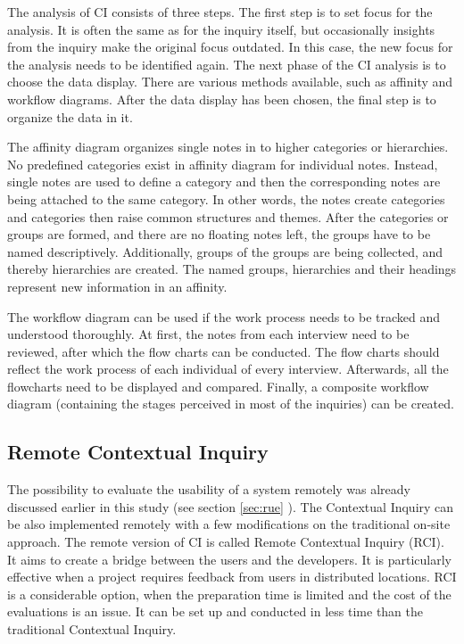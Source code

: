 \documentclass[12pt,a4paper,oneside,pdftex]{report}
\begin{document}
The analysis of CI consists of three steps. The first step is to set focus for the analysis. It is often the same as for the inquiry itself, but occasionally insights from the inquiry make the original focus outdated. In this case, the new focus for the analysis needs to be identified again. The next phase of the CI analysis is to choose the data display. There are various methods available, such as affinity and workflow diagrams. After the data display has been chosen, the final step is to organize the data in it. \citep{RefWorks:28}

The affinity diagram organizes single notes in to higher categories or hierarchies. No predefined categories exist in affinity diagram for individual notes. Instead, single notes are used to define a category and then the corresponding notes are being attached to the same category. In other words, the notes create categories and categories then raise common structures and themes. After the categories or groups are formed, and there are no floating notes left, the groups have to be named descriptively. Additionally, groups of the groups are being collected, and thereby hierarchies are created. The named groups, hierarchies and their headings represent new information in an affinity. \citep{RefWorks:21, RefWorks:28}

The workflow diagram can be used if the work process needs to be tracked and understood thoroughly. At first, the notes from each interview need to be reviewed, after which the flow charts can be conducted. The flow charts should reflect the work process of each individual of every interview. Afterwards, all the flowcharts need to be displayed and compared. Finally, a composite workflow diagram (containing the stages perceived in most of the inquiries) can be created. \citep{RefWorks:28}

\subsection{Remote Contextual Inquiry}
The possibility to evaluate the usability of a system remotely was already discussed earlier in this study (see section \ref{sec:rue} ). The Contextual Inquiry can be also implemented remotely with a few modifications on the traditional on-site approach. The remote version of CI is called Remote Contextual Inquiry (RCI). It aims to create a bridge between the users and the developers. It is particularly effective when a project requires feedback from users in distributed locations. RCI is a considerable option, when the preparation time is limited and the cost of the evaluations is an issue. It can be set up and conducted in less time than the traditional Contextual Inquiry. \citep{RefWorks:32}
\end{document}
